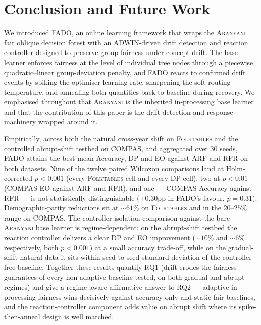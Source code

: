 \documentclass[sigconf,anonymous,review]{acmart}
\begin{document}
\section{Conclusion and Future Work}
\label{sec:conclusion}
We introduced \textsc{FADO}, an online learning framework that wraps the \textsc{Aranyani} fair oblique decision forest with an ADWIN-driven drift detection
and reaction controller designed to preserve group fairness under concept drift. The base learner enforces fairness at the level of individual tree nodes
through a piecewise quadratic--linear group-deviation penalty, and \textsc{FADO} reacts to confirmed drift events by spiking the optimiser learning rate,
sharpening the soft-routing temperature, and annealing both quantities back to baseline during recovery. We emphasised throughout that \textsc{Aranyani} is the
inherited in-processing base learner and that the contribution of this paper is the drift-detection-and-response machinery wrapped around it.

Empirically, across both the natural cross-year shift on \textsc{Folktables} and the controlled abrupt-shift testbed on \textsc{COMPAS}, and aggregated
over $30$ seeds, \textsc{FADO} attains the best mean Accuracy, DP and EO against \textsc{ARF} and \textsc{RFR} on both datasets. Nine of the twelve
paired Wilcoxon comparisons land at Holm-corrected $p<0.001$ (every \textsc{Folktables} cell and every DP cell), two at $p<0.01$ (COMPAS EO against
\textsc{ARF} and \textsc{RFR}), and one --- COMPAS Accuracy against \textsc{RFR} --- is not statistically distinguishable ($+0.30$pp in \textsc{FADO}'s
favour, $p=0.31$). Demographic-parity reductions sit at $\sim 61\%$ on \textsc{Folktables} and in the $20$--$25\%$ range on \textsc{COMPAS}. The controller-isolation comparison against the bare \textsc{Aranyani} base learner is regime-dependent: on the abrupt-shift testbed the
reaction controller delivers a clear DP and EO improvement ($\sim$$10\%$ and $\sim$$6\%$ respectively, both $p<0.001$) at a small accuracy trade-off, while
on the gradual-shift natural data it sits within seed-to-seed standard deviation of the controller-free baseline. Together these results quantify RQ1
(drift erodes the fairness guarantees of every non-adaptive baseline tested, on both gradual and abrupt regimes) and give a regime-aware affirmative
answer to RQ2 --- adaptive in-processing fairness wins decisively against accuracy-only and static-fair baselines, and the reaction-controller component
adds value on abrupt shift where its spike-then-anneal design is well matched.
\end{document}
